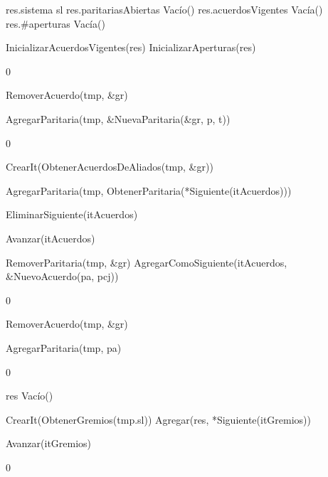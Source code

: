 {
	\state res.sistema \asig sl						
	\state res.paritariasAbiertas \asig Vacío()		
	\state res.acuerdosVigentes \asig Vacía()		
	\state res.\#aperturas \asig Vacía()			
	\state

	\state InicializarAcuerdosVigentes(res)			
	\state InicializarAperturas(res)				
}
{0}

{
							
		\state RemoverAcuerdo(tmp, \&gr)							
	\endif
	\state

	\state AgregarParitaria(tmp, \&NuevaParitaria(\&gr, p, t))		
}
{0}

{

	\state {} \asig CrearIt(ObtenerAcuerdosDeAliados(tmp, \&gr))		
			
		\state

		\state AgregarParitaria(tmp, ObtenerParitaria(*Siguiente(itAcuerdos)))		

		\state EliminarSiguiente(itAcuerdos)										

		\state
		\state Avanzar(itAcuerdos)													
	\endwhile
	\state

	\state {} \asig RemoverParitaria(tmp, \&gr)		
	\state AgregarComoSiguiente(itAcuerdos, \&NuevoAcuerdo(pa, pcj))			
}
{0}

{
	\state {} \asig RemoverAcuerdo(tmp, \&gr)			

	\state AgregarParitaria(tmp, pa)											
}
{0}

{
	\state res \asig Vacío()								

	\state
	\state {} \asig CrearIt(ObtenerGremios(tmp.sl))						
					
		\state
		\state Agregar(res, *Siguiente(itGremios))			

		\state
		\state Avanzar(itGremios)						
	\endwhile
}
{0}

